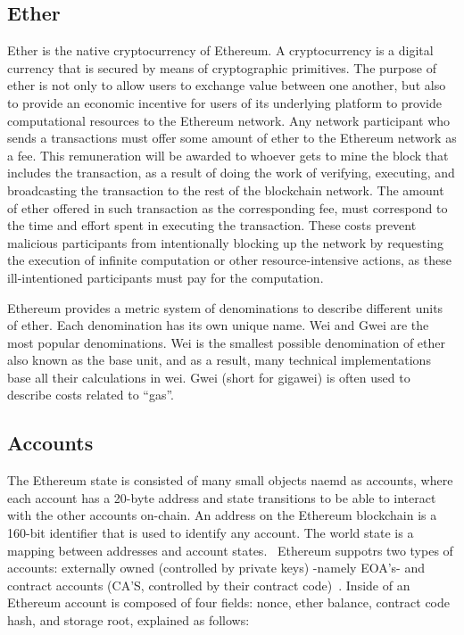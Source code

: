     \subsection{Ether}
        Ether is the native cryptocurrency of Ethereum.
        A cryptocurrency is a digital currency that is secured by means of cryptographic primitives.
        The purpose of ether is not only to allow users to exchange value between one another, but also to provide an economic incentive for users of its underlying platform to
        provide computational resources to the Ethereum network.
        Any network participant who sends a transactions must offer some amount of ether to the Ethereum network as a fee.
        This remuneration will be awarded to whoever gets to mine the block that includes the transaction, as a result of doing the work of verifying, executing, and broadcasting
        the transaction to the rest of the blockchain network.
        The amount of ether offered in such transaction as the corresponding fee, must correspond to the time and effort spent in executing the transaction.
        These costs prevent malicious participants from intentionally blocking up the network by requesting the execution of infinite computation or other resource-intensive actions,
        as these ill-intentioned participants must pay for the computation.

        Ethereum provides a metric system of denominations to describe different units of ether.
        Each denomination has its own unique name.
        Wei and Gwei are the most popular denominations.
        Wei is the smallest possible denomination of ether also known as the base unit, and as a result, many technical implementations base all their calculations in wei.
        Gwei (short for gigawei) is often used to describe costs related to “gas”.

    \subsection{Accounts}
        The Ethereum state is consisted of many small objects naemd as accounts, where each account has a 20-byte address and state transitions to be able to interact with the other accounts on-chain.
        An address on the Ethereum blockchain is a 160-bit identifier that is used to identify any account.
        The world state is a mapping between addresses and account states.~\cite{wood2014ethereum}
        Ethereum suppotrs two types of accounts: externally owned
        (controlled by private keys) -namely EOA's- and contract accounts (CA'S, controlled by their contract code)~\cite{ethereum2014ethereum}.
        Inside of an Ethereum account is composed of four fields: nonce, ether balance, contract code hash, and storage root, explained as follows:

